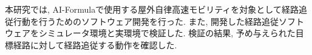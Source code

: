 本研究では, AI-Formulaで使用する屋外自律高速モビリティを対象として経路追従行動を行うためのソフトウェア開発を行った.
また, 開発した経路追従ソフトウェアをシミュレータ環境と実環境で検証した.
検証の結果, 予め与えられた目標経路に対して経路追従する動作を確認した.
